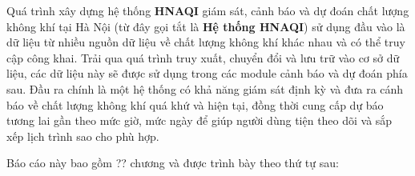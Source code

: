 Quá trình xây dựng hệ thống \textbf{HNAQI} giám sát, cảnh báo và dự đoán chất lượng không khí tại Hà Nội (từ đây gọi tắt là \textbf{Hệ thống HNAQI}) sử dụng đầu vào là dữ liệu từ nhiều nguồn dữ liệu về chất lượng không khí khác nhau và có thể truy cập công khai. Trải qua quá trình truy xuất, chuyển đổi và lưu trữ vào cơ sở dữ liệu, các dữ liệu này sẽ được sử dụng trong các module cảnh báo và dự đoán phía sau. Đầu ra chính là một hệ thống có khả năng giám sát định kỳ và đưa ra cánh báo về chất lượng không khí quá khứ và hiện tại, đồng thời cung cấp dự báo tương lai gần theo mức giờ, mức ngày để giúp người dùng tiện theo dõi và sắp xếp lịch trình sao cho phù hợp.

Báo cáo này bao gồm ?? chương và được trình bày theo thứ tự sau:



